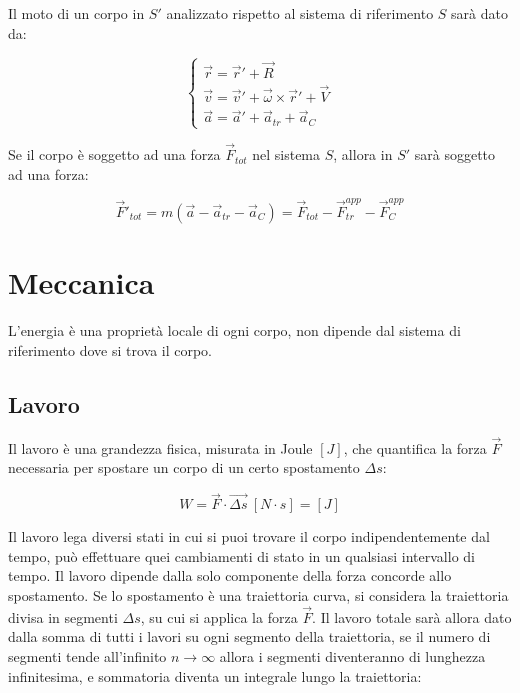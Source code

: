 \documentclass{article}
\numberwithin{equation}{subsection}
\begin{document}
Il moto di un corpo in $S'$ analizzato rispetto al sistema 
di riferimento $S$ sarà dato da:

\begin{equation}
    \begin{cases}
        \vec{r}=\vec{r}'+\vec{R}\\
        \vec{v}=\vec{v}'+\vec{\omega}\times\vec{r}'+\vec{V}\\
        \vec{a}=\vec{a}'+\vec{a}_{tr}+\vec{a}_C
    \end{cases}
\end{equation}
    
Se il corpo è soggetto ad una forza $\vec{F}_{tot}$ nel 
sistema $S$, allora in $S'$ sarà soggetto ad una forza: 

\begin{equation}
    \vec{F}'_{tot}=m(\vec{a}-\vec{a}_{tr}-\vec{a}_C)=\vec{F}_{tot}-\vec{F}^{app}_{tr}-\vec{F}^{app}_C
\end{equation}

\clearpage

\section{Meccanica}
L'energia è una proprietà locale di ogni corpo, non dipende dal 
sistema di riferimento dove si trova il corpo. 

\subsection{Lavoro}
Il lavoro è una grandezza fisica, misurata in Joule $\left[J\right]$, che quantifica la forza $\vec{F}$
necessaria per spostare un corpo di un certo spostamento $\Delta s$: 

\begin{equation}
    W=\vec{F}\cdot\vec{\Delta s}\:\left[N\cdot s\right]=\left[J\right]
\end{equation}

Il lavoro lega diversi stati in cui si puoi trovare il corpo 
indipendentemente dal tempo, può effettuare quei cambiamenti 
di stato in un qualsiasi intervallo di tempo. Il lavoro dipende 
dalla solo componente della forza concorde allo spostamento.
Se lo spostamento è una traiettoria curva, si considera la 
traiettoria divisa in segmenti $\Delta s$, su cui si 
applica la forza $\vec{F}$. Il lavoro totale sarà allora dato 
dalla somma di tutti i lavori su ogni segmento della 
traiettoria, se il numero di segmenti tende all'infinito $n\to\infty$ 
allora i segmenti diventeranno di lunghezza infinitesima, e 
sommatoria diventa un integrale lungo la traiettoria:
\end{document}

